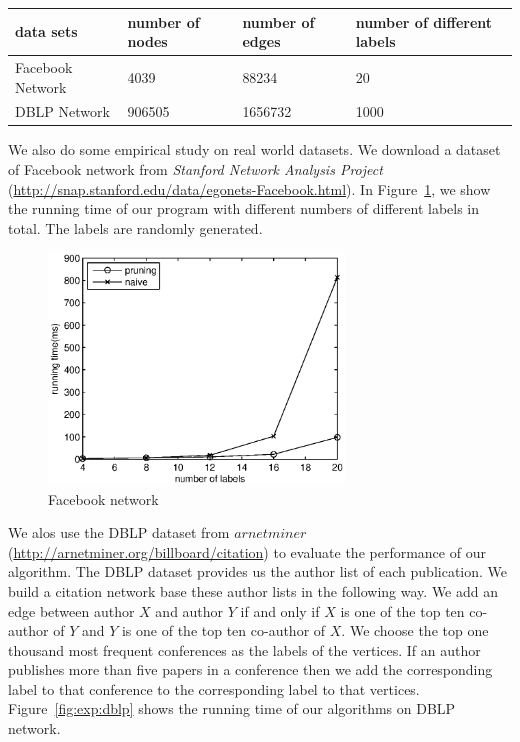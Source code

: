 \begin{table}[h]
    \centering
    \begin{tabular}{|l|l|l|l|}
    \hline
    data sets        & number of nodes & number of edges & number of different labels \\ \hline
    Facebook Network & 4039            & 88234           & 20                         \\ \hline
    DBLP Network     & 906505          & 1656732         & 1000                       \\ \hline
    \end{tabular}
    \label{tab:exp:fb_dblp}
\end{table}

We also do some empirical study on real world datasets. We download a dataset of Facebook network from \emph{Stanford Network Analysis Project} (\url{http://snap.stanford.edu/data/egonets-Facebook.html}). In Figure~\ref{fig:exp:fb}, we show the running time of our program with different numbers of different labels in total. The labels are randomly generated.

\begin{figure}[h]
    \centering
      \includegraphics[width=0.7\textwidth]{figs/FB}
    \caption{Facebook network}
    \label{fig:exp:fb}
\end{figure}


We alos use the DBLP dataset from $arnetminer$ (\url{http://arnetminer.org/billboard/citation}) to evaluate the performance of our algorithm. The DBLP dataset provides us the author list of each publication. We build a citation network base these author lists in the following way. We add an edge between author $X$ and author $Y$ if and only if $X$ is one of the top ten co-author of $Y$ and $Y$ is one of the top ten co-author of $X$. We choose the top one thousand most frequent conferences as the labels of the vertices. If an author publishes more than five papers in a conference then we add the corresponding label to that conference to the corresponding label to that vertices. Figure~\ref{fig:exp:dblp} shows the running time of our algorithms on DBLP network.


